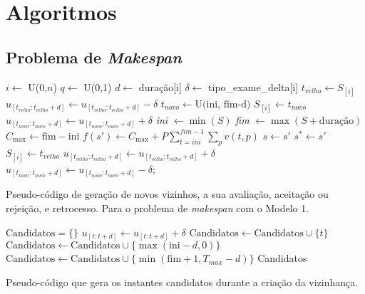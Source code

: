 \chapter{Algoritmos}
\label{chp:algo}

\section{Problema de \textit{Makespan}}

\newpage

\begin{algorithm}[H]
\label{algo:P1M1_main_algo}
	$i \gets$ U(0,$n$)\;
    $q \gets$ U(0,1)\;
    $d \gets$ duração[i]\;
    $\delta \gets$ tipo\_exame\_delta[i]\;
    $t_{velho} \gets S_{[i]}$\;
    $u_{[t_{velho}: t_{velho}+d]} \gets u_{[t_{velho}: t_{velho}+d]} - \delta$\;
    $t_{novo} \gets \text{U(ini, fim-d)}$\;
    $S_{[i]} \gets t_{novo}$\;
    $u_{[t_{novo}: t_{novo}+d]} \gets u_{[t_{novo}: t_{novo}+d]} + \delta$\;
    \textit{ini} $\gets \min(S)$\;
    \textit{fim} $\gets \max(S+\text{duração})$\;
    $C_{\max} \gets \text{fim} - \text{ini}$\;
    $f(s') \gets C_{\max} + P \sum_{t=ini}^{fim-1}\sum_{p}v(t,p)$\;
	{
		$s \gets s'$\;
		{
			$s^* \gets s'$
		}
	}
	\Else
	{
		$S_{[i]} \gets t_{velho}$\;
    	$u_{[t_{velho}: t_{velho}+d]} \gets u_{[t_{velho}: t_{velho}+d]} + \delta$\;
		$u_{[t_{novo}: t_{novo}+d]} \gets u_{[t_{novo}: t_{novo}+d]} - \delta$;\
	}    
    \caption{Pseudo-código de geração de novos vizinhos, a sua avaliação, aceitação ou rejeição, e retrocesso. Para o problema de \textit{makespan} com o Modelo 1.}
\end{algorithm}


\begin{algorithm}[H]
\label{algo:P1M1_cand_gen}
	$\text{Candidatos}=\{\}$\;
	{
		$u_{[t: t+d]} \gets u_{[t: t+d]} + \delta$\;
		{	
			$\text{Candidatos} \gets \text{Candidatos} \cup \{t\}$\;
		}
	}
	$\text{Candidatos} \gets \text{Candidatos} \cup \{\max(\text{ini}-d, 0)\}$\;
	$\text{Candidatos} \gets \text{Candidatos} \cup \{\min(\text{fim}+1, T_{max}-d)\}$\;
	\Return Candidatos
    \caption{Pseudo-código que gera os instantes candidatos durante a criação da vizinhança.}
    \label{algo:cand}
\end{algorithm}

